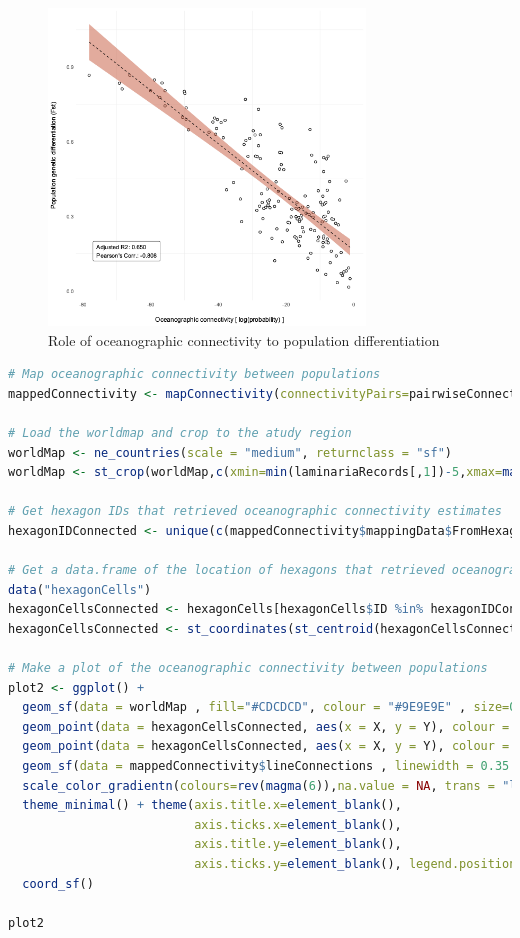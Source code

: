 \documentclass[
]{article}
\begin{document}
\begin{figure}
\centering
\includegraphics[width=0.75\textwidth,height=\textheight]{../img/Example1_img_2.png}
\caption{Role of oceanographic connectivity to population
differentiation}
\end{figure}

\begin{lstlisting}[language=R]
# Map oceanographic connectivity between populations
mappedConnectivity <- mapConnectivity(connectivityPairs=pairwiseConnectivity$connectivityPairs)

# Load the worldmap and crop to the atudy region
worldMap <- ne_countries(scale = "medium", returnclass = "sf")
worldMap <- st_crop(worldMap,c(xmin=min(laminariaRecords[,1])-5,xmax=max(laminariaRecords[,1])+5,ymin=min(laminariaRecords[,2])-2.5,ymax=max(laminariaRecords[,2])+2.5))

# Get hexagon IDs that retrieved oceanographic connectivity estimates
hexagonIDConnected <- unique(c(mappedConnectivity$mappingData$FromHexagon,mappedConnectivity$mappingData$FromHexagon))

# Get a data.frame of the location of hexagons that retrieved oceanographic connectivity estimates
data("hexagonCells")
hexagonCellsConnected <- hexagonCells[hexagonCells$ID %in% hexagonIDConnected,1]
hexagonCellsConnected <- st_coordinates(st_centroid(hexagonCellsConnected))

# Make a plot of the oceanographic connectivity between populations
plot2 <- ggplot() + 
  geom_sf(data = worldMap , fill="#CDCDCD", colour = "#9E9E9E" , size=0.25) +
  geom_point(data = hexagonCellsConnected, aes(x = X, y = Y), colour = "#000000",size=2.5) +
  geom_point(data = hexagonCellsConnected, aes(x = X, y = Y), colour = "#FFFFFF",size=1.25) +
  geom_sf(data = mappedConnectivity$lineConnections , linewidth = 0.35 , aes(colour = Value), alpha=0.75) +
  scale_color_gradientn(colours=rev(magma(6)),na.value = NA, trans = "log") +
  theme_minimal() + theme(axis.title.x=element_blank(),
                          axis.ticks.x=element_blank(),
                          axis.title.y=element_blank(),
                          axis.ticks.y=element_blank(), legend.position = "none") +
  coord_sf()

plot2
\end{lstlisting}
\end{document}

